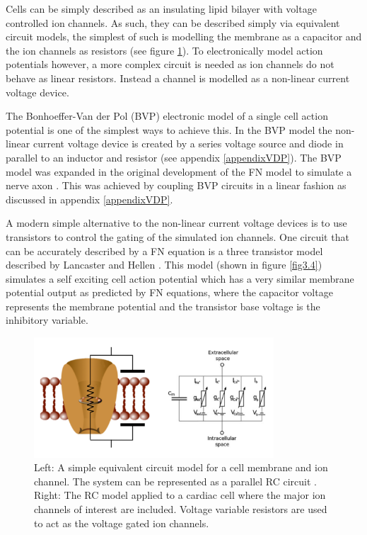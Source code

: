Cells can be simply described as an insulating lipid bilayer with voltage controlled ion channels. As such, they can be described simply via equivalent circuit models, the simplest of such is modelling the membrane as a capacitor and the ion channels as resistors (see figure \ref{fig3.1}). To electronically model action potentials however, a more complex circuit is needed as ion channels do not behave as linear resistors. Instead a channel is modelled as a non-linear current voltage device. \par

The Bonhoeffer-Van der Pol (BVP) electronic model of a single cell action potential is one of the simplest ways to achieve this. In the BVP model the non-linear current voltage device is created by a series voltage source and diode in parallel to an inductor and resistor (see appendix \ref{appendixVDP}). The BVP model was expanded in the original development of the FN model to simulate a nerve axon \citep{fitzhughnagumo}. This was achieved by coupling BVP circuits in a linear fashion as discussed in appendix \ref{appendixVDP}. \par 

A modern simple alternative to the non-linear current voltage devices is to use transistors to control the gating of the simulated ion channels. One circuit that can be accurately described by a FN equation is a three transistor model described by Lancaster and Hellen \citep{3transistor}. This model (shown in figure \ref{fig3.4}) simulates a self exciting cell action potential which has a very similar membrane potential output as predicted by FN equations, where the capacitor voltage represents the membrane potential and the transistor base voltage is the inhibitory variable. \par

\begin{figure}[H]
    \centering
    \includegraphics[width=0.8\textwidth]{images/simpleelectronic.png}
    \caption{Left: A simple equivalent circuit model for a cell membrane and ion channel. The system can be represented as a parallel RC circuit \citep{simpleelectronic}. Right: The RC model applied to a cardiac cell where the major ion channels of interest are included. Voltage variable resistors are used to act as the voltage gated ion channels. \citep{phdpaper}}
    \label{fig3.1}
\end{figure}


